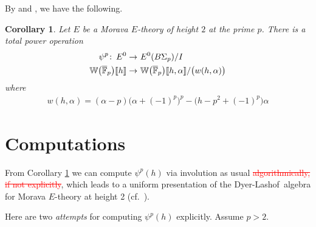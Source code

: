 \documentclass{rs}
\newtheorem{cor}[equation]{Corollary}
\theoremstyle{definition}
\theoremstyle{remark}
\def\co{\colon\thinspace}
\newcommand{\mb}[1]{\mathbb{#1}}
\newcommand{\cF}{\overline {\mb F}}
\newcommand{\DL}{Dyer-Lashof~}
\newcommand{\BW}{{\mb W}}
\newcommand{\A}{\alpha}
\newcommand{\lb}{\llbracket}
\newcommand{\rb}{\rrbracket}
\renewcommand{\=}{\approx}
\renewcommand{\-}{\sim}
\newcommand{\rd}[1]{{\textcolor{red}{#1}}}
\numberwithin{equation}{section}
\begin{document}
By \cite[Theorem 1.1]{Str98} and \cite[Theorem B]{cong}, we have the following.  

\begin{cor}
 \label{cor}
 Let $E$ be a Morava $E$-theory of height $2$ at the prime $p$.  
 There is a total power operation 
 \[
  \begin{split}
                \psi^p \co E^0 \to & ~ E^0(B\Sigma_p) / I \\
   \BW\big(\cF_p\big)\lb h \rb \to & ~ \BW\big(\cF_p\big)\lb h, \A \rb / \big(w(h,\A)\big) 
  \end{split}
 \]
 where 
 \[
  \begin{split}
   w(h,\A) = (\A - p) \big(\A + (-1)^p\big)^p - \big(h - p^2 + (-1)^p\big) \A 
  \end{split}
 \]
\end{cor}



\section{Computations}

From Corollary \ref{cor} we can compute $\psi^p(h)$ via involution as usual \rd{\sout{algorithmically, if not explicitly}}, 
which leads to a uniform presentation of the \DL algebra for Morava $E$-theory at height 2 (cf.~\cite[Remark 6.6]{ho}).  

Here are two {\em attempts} for computing $\psi^p(h)$ explicitly.  Assume $p > 2$.  
\end{document}
